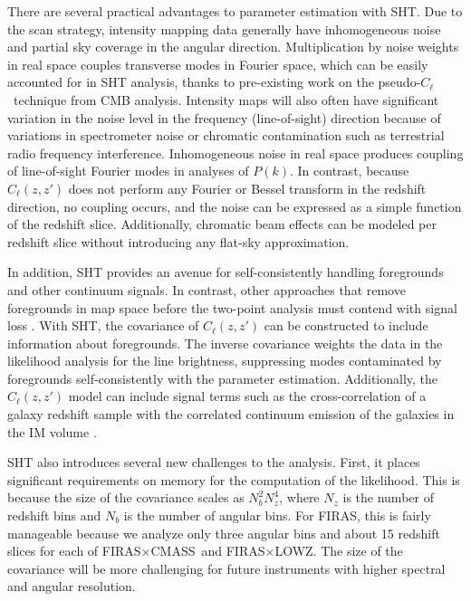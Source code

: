 \documentclass[fleqn,usenatbib]{mnras}
\newcommand{\pcl}{pseudo-$C_{\ell}$}
\newcommand{\FLZ}{FIRAS${\times}$LOWZ}
\newcommand{\FC}{FIRAS${\times}$CMASS}
\begin{document}
There are several practical advantages to parameter estimation with SHT. Due to the scan strategy, intensity mapping data generally have inhomogeneous noise and partial sky coverage in the angular direction. Multiplication by noise weights in real space couples transverse modes in Fourier space, which can be easily accounted for in SHT analysis, thanks to pre-existing work \citep{hivon2002master, tristram2005xspect} on the \pcl\ technique from CMB analysis. Intensity maps will also often have significant variation in the noise level in the frequency (line-of-sight) direction because of variations in spectrometer noise or chromatic contamination such as terrestrial radio frequency interference. Inhomogeneous noise in real space produces coupling of line-of-sight Fourier modes in analyses of $P(k)$. In contrast, because $C_{\ell}(z,z')$ does not perform any Fourier or Bessel transform in the redshift direction, no coupling occurs, and the noise can be expressed as a simple function of the redshift slice. Additionally, chromatic beam effects can be modeled per redshift slice without introducing any flat-sky approximation. 

In addition, SHT provides an avenue for self-consistently handling foregrounds and other continuum signals. In contrast, other approaches that remove foregrounds in map space before the two-point analysis must contend with signal loss \citep{Switzer:2015ria, 2018ApJ...868...26C}. With SHT, the covariance of $C_{\ell}(z,z')$ can be constructed to include information about foregrounds. The inverse covariance weights the data in the likelihood analysis for the line brightness, suppressing modes contaminated by foregrounds self-consistently with the parameter estimation. Additionally, the $C_\ell(z,z')$ model can include signal terms such as the cross-correlation of a galaxy redshift sample with the correlated continuum emission of the galaxies in the IM volume \citep{Serra:2014pva, pullen2018search, Switzer:2018tel}. 

SHT also introduces several new challenges to the analysis. First, it places significant requirements on memory for the computation of the likelihood. This is because the size of the covariance scales as $N_b^2 N_z^4$, where $N_z$ is the number of redshift bins and $N_b$ is the number of angular bins. For FIRAS, this is fairly manageable because we analyze only three angular bins and about 15 redshift slices for each of \FC\ and \FLZ. The size of the covariance will be more challenging for future instruments with higher spectral and angular resolution.
\end{document}
